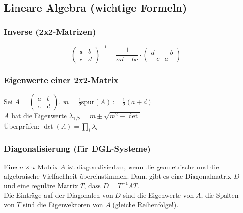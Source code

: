 \documentclass[8pt, a4paper, landscape, fleqn]{scrartcl}
\begin{document}
\begin{multicols*}{3}
			\subsection{Lineare Algebra (wichtige Formeln)}
				\subsubsection{Inverse (2x2-Matrizen)}
					\begin{equation*}
						\begin{pmatrix}
						    a & b \\ c & d
						\end{pmatrix}^{-1}
						=\frac{1}{ad-bc}\cdot
						\begin{pmatrix}
							d & -b \\ -c & a
						\end{pmatrix}
					\end{equation*}
				\subsubsection{Eigenwerte einer 2x2-Matrix}
				Sei $A =  \begin{pmatrix}
				    a&b\\c&d
				\end{pmatrix}$. \hspace{0.25cm} $m = \frac{1}{2}\text{spur}(A):= \frac{1}{2}(a+d)$ \\
				$A$ hat die Eigenwerte $\lambda_{1/2} = m \pm \sqrt{m^2-\det}$ \\
				Überprüfen: $\det(A) = \prod_i \lambda_i$
				\subsubsection{Diagonalisierung (für DGL-Systeme)}
				    Eine $n \times n$ Matrix $A$ ist diagonalisierbar, wenn die geometrische und die algebraische Vielfachheit übereinstimmen. Dann gibt es eine Diagonalmatrix $D$ und eine reguläre Matrix $T$, dass $D = T^{-1}AT$. \\
				    Die Einträge auf der Diagonalen von $D$ sind die Eigenwerte von $A$, die Spalten von $T$ sind die Eigenvektoren von $A$ (gleiche Reihenfolge!). 

\end{multicols*}
\end{document}
